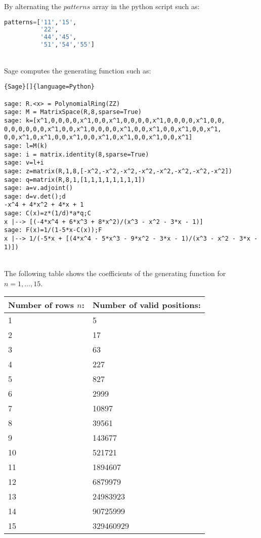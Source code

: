 \documentclass[12pt]{report}
\begin{document}
{{\noindent By alternating the $patterns$ array in the python script such as:
{
\begin{lstlisting}[language=Python]
patterns=['11','15',
          '22',
          '44','45',
          '51','54','55']

\end{lstlisting}} \quad \\

\noindent Sage computes the generating function such as:
{
\begin{lstlisting}{Sage}[]{language=Python}

sage: R.<x> = PolynomialRing(ZZ)
sage: M = MatrixSpace(R,8,sparse=True)
sage: k=[x^1,0,0,0,0,x^1,0,0,x^1,0,0,0,0,x^1,0,0,0,0,x^1,0,0,
0,0,0,0,0,0,x^1,0,0,x^1,0,0,0,0,x^1,0,0,x^1,0,0,x^1,0,0,x^1,
0,0,x^1,0,x^1,0,0,x^1,0,0,x^1,0,x^1,0,0,x^1,0,0,x^1]
sage: l=M(k)
sage: i = matrix.identity(8,sparse=True)
sage: v=l+i
sage: z=matrix(R,1,8,[-x^2,-x^2,-x^2,-x^2,-x^2,-x^2,-x^2,-x^2])
sage: q=matrix(R,8,1,[1,1,1,1,1,1,1,1])
sage: a=v.adjoint()
sage: d=v.det();d
-x^4 + 4*x^2 + 4*x + 1
sage: C(x)=z*(1/d)*a*q;C
x |--> [(-4*x^4 + 6*x^3 + 8*x^2)/(x^3 - x^2 - 3*x - 1)]
sage: F(x)=1/(1-5*x-C(x));F
x |--> 1/(-5*x + [(4*x^4 - 5*x^3 - 9*x^2 - 3*x - 1)/(x^3 - x^2 - 3*x - 1)])

\end{lstlisting}} \quad \\

\noindent The following table shows the coefficients of the generating function for $n=1,\ldots,15$.

\begin{center}
\begin{tabular}{ |p{3cm}|p{3cm}|  }
 \hline
 Number of rows 	$n$: & Number of valid positions: \\
 \hline
 1   & 5    \\
 2 &   17  \\
 3 & 63 \\
 4    & 227 \\
 5 &   827  \\
 6 & 2999  \\
 7 & 10897  \\
 8 & 39561  \\
 9 & 143677  \\
 10 & 521721  \\
 11 & 1894607  \\
 12 & 6879979  \\
 13 & 24983923  \\
 14 & 90725999  \\
 15 & 329460929  \\
 \hline
\end{tabular}
\end{center}

}}
\end{document}
